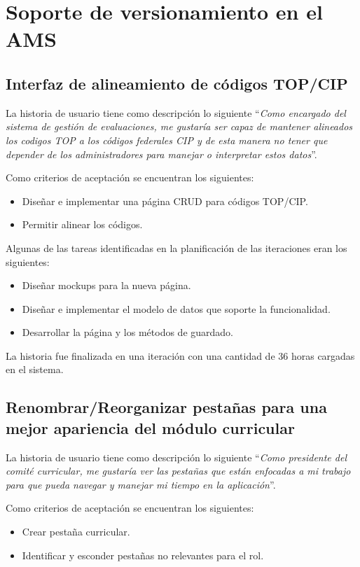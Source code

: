 \section{Soporte de versionamiento en el AMS}
\subsection{Interfaz de alineamiento de códigos TOP/CIP}
La historia de usuario tiene como descripción lo siguiente \enquote{\textit{Como encargado del sistema de gestión de evaluaciones, me gustaría ser capaz de mantener alineados los codigos TOP a los códigos federales CIP y de esta manera no tener que depender de los administradores para manejar o interpretar estos datos}}.

Como criterios de aceptación se encuentran los siguientes:
\begin{itemize}
	\item Diseñar e implementar una página CRUD para códigos TOP/CIP.
	\item Permitir alinear los códigos.
\end{itemize}

Algunas de las tareas identificadas en la planificación de las iteraciones eran los siguientes:
\begin{itemize}
	\item Diseñar mockups para la nueva página.
	\item Diseñar e implementar el modelo de datos que soporte la funcionalidad.
	\item Desarrollar la página y los métodos de guardado.
\end{itemize}

La historia fue finalizada en una iteración con una cantidad de 36 horas cargadas en el sistema.

\subsection{Renombrar/Reorganizar pestañas para una mejor apariencia del módulo curricular}
La historia de usuario tiene como descripción lo siguiente \enquote{\textit{Como presidente del comité curricular, me gustaría ver las pestañas que están enfocadas a mi trabajo para que pueda navegar y manejar mi tiempo en la aplicación}}.

Como criterios de aceptación se encuentran los siguientes:
\begin{itemize}
	\item Crear pestaña curricular.
	\item Identificar y esconder pestañas no relevantes para el rol.
\end{itemize}

